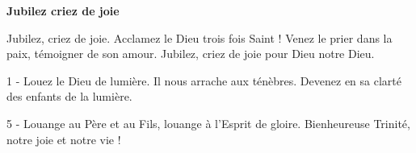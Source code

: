 \textbf{Jubilez criez de joie}

Jubilez, criez de joie. Acclamez le Dieu trois fois Saint ! Venez le prier dans la paix, témoigner de son amour.
Jubilez, criez de joie pour Dieu notre Dieu.

1 - Louez le Dieu de lumière. Il nous arrache aux ténèbres. Devenez en sa clarté des enfants de la lumière.

5 - Louange au Père et au Fils, louange à l'Esprit de gloire. Bienheureuse Trinité, notre joie et notre vie !

